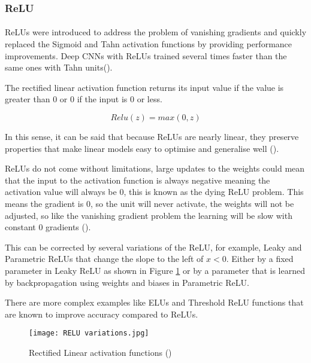 \subsubsection{\gls{ReLU}}
\paragraph{}
\gls{ReLU}s were introduced to address the problem of vanishing gradients and quickly replaced the Sigmoid and Tahn activation functions by providing performance improvements. Deep \gls{CNN}s with \gls{ReLU}s trained several times faster than the same ones with Tahn units(\cite{GoodBengCour16}).

The rectified linear activation function returns its input value if the value is greater than $0$ or $0$ if the input is $0$ or less.

\begin{equation}
    \label{eq_relu}
    Relu(z) = max(0, z)
\end{equation}

In this sense, it can be said that because \gls{ReLU}s are nearly linear, they preserve properties that make linear models easy to optimise and generalise well (\cite{GoodBengCour16}).

\gls{ReLU}s do not come without limitations, large updates to the weights could mean that the input to the activation function is always negative meaning the activation value will always be $0$, this is known as the dying \gls{ReLU} problem. This means the gradient is $0$, so the unit will never activate, the weights will not be adjusted, so like the vanishing gradient problem the learning will be slow with constant 0 gradients (\cite{Maas13rectifiernonlinearities}).

This can be corrected by several variations of the \gls{ReLU}, for example, Leaky and Parametric \gls{ReLU}s that change the slope to the left of $x < 0$. Either by a fixed parameter in Leaky \gls{ReLU} as shown in Figure \ref{fig_relu} or by a parameter that is learned by backpropagation using weights and biases in Parametric \gls{ReLU}. 

There are more complex examples like \gls{ELU}s and Threshold \gls{ReLU} functions that are known to improve accuracy compared to \gls{ReLU}s.

\begin{figure}[hbt!]
        \centering
        \texttt{[image: RELU variations.jpg]}
        \caption{Rectified Linear activation functions (\cite{leakyreluimg})}
        \label{fig_relu}
\end{figure}

